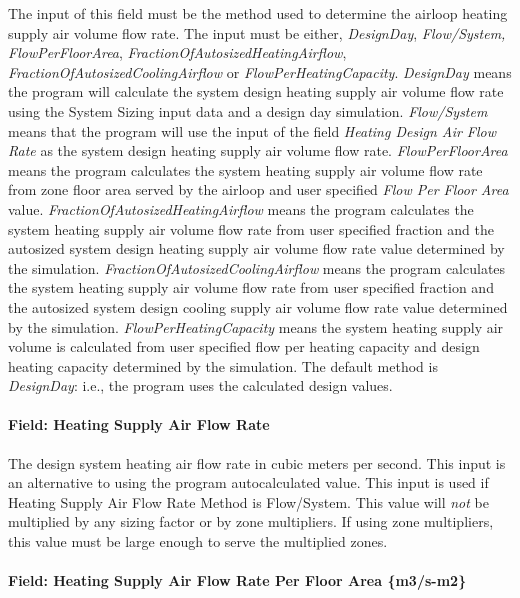 The input of this field must be the method used to determine the airloop heating supply air volume flow rate. The input must be either, \emph{DesignDay}, \emph{Flow/System,} \emph{FlowPerFloorArea}, \emph{FractionOfAutosizedHeatingAirflow}, \emph{FractionOfAutosizedCoolingAirflow} or \emph{FlowPerHeatingCapacity}. \emph{DesignDay} means the program will calculate the system design heating supply air volume flow rate using the System Sizing input data and a design day simulation. \emph{Flow/System} means that the program will use the input of the field \emph{Heating Design Air Flow Rate} as the system design heating supply air volume flow rate. \emph{FlowPerFloorArea} means the program calculates the system heating supply air volume flow rate from zone floor area served by the airloop and user specified \emph{Flow Per Floor Area} value. \emph{FractionOfAutosizedHeatingAirflow} means the program calculates the system heating supply air volume flow rate from user specified fraction and the autosized system design heating supply air volume flow rate value determined by the simulation. \emph{FractionOfAutosizedCoolingAirflow} means the program calculates the system heating supply air volume flow rate from user specified fraction and the autosized system design cooling supply air volume flow rate value determined by the simulation. \emph{FlowPerHeatingCapacity} means the system heating supply air volume is calculated from user specified flow per heating capacity and design heating capacity determined by the simulation. The default method is \emph{DesignDay}: i.e., the program uses the calculated design values.

\paragraph{Field: Heating Supply Air Flow Rate}\label{field-heating-supply-air-flow-rate}

The design system heating air flow rate in cubic meters per second. This input is an alternative to using the program autocalculated value. This input is used if Heating Supply Air Flow Rate Method is Flow/System. This value will \emph{not} be multiplied by any sizing factor or by zone multipliers. If using zone multipliers, this value must be large enough to serve the multiplied zones.

\paragraph{Field: Heating Supply Air Flow Rate Per Floor Area \{m3/s-m2\}}\label{field-heating-supply-air-flow-rate-per-floor-area-m3s-m2}

